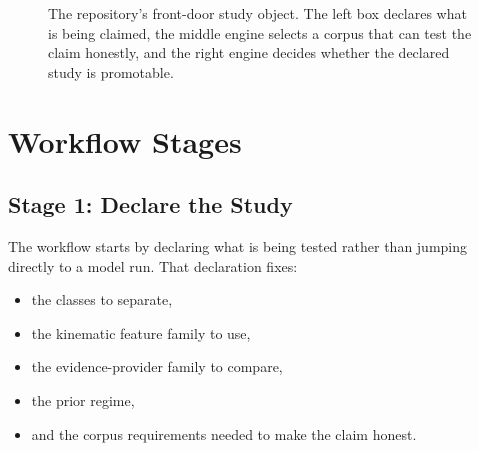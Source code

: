 \documentclass[11pt]{article}
\begin{document}
\begin{figure}[htbp]
\centering
\setlength{\fboxsep}{8pt}
\caption{The repository's front-door study object. The left box declares what is being claimed, the middle engine selects a corpus that can test the claim honestly, and the right engine decides whether the declared study is promotable.}
\label{fig:study_object_map}
\end{figure}

\section{Workflow Stages}
\subsection{Stage 1: Declare the Study}
The workflow starts by declaring what is being tested rather than jumping directly to a model run. That declaration fixes:
\begin{itemize}[leftmargin=1.5em]
  \item the classes to separate,
  \item the kinematic feature family to use,
  \item the evidence-provider family to compare,
  \item the prior regime,
  \item and the corpus requirements needed to make the claim honest.
\end{itemize}
\end{document}
